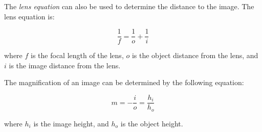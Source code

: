 The \textit{lens equation}  can also be used to determine the distance to the image.  The lens equation is:

	\begin{mdframed}[backgroundcolor=orange!20!white]
	
	\begin{equation}
	\frac{1}{f} = \frac{1}{o} + \frac{1}{i}
	\label{equation:lens}
	\end{equation}
\end{mdframed}
 where $f$ is the focal length of the lens, $o$ is the object distance from the lens, and $i$ is the image distance from the lens.  
 
 The magnification of an image can be determined by the following equation:
 	\begin{mdframed}[backgroundcolor=orange!20!white]
 	
 	\begin{equation}
 	m = - \frac{i}{o} = \frac{h_i}{h_o}
 	\label{equation:magnification}
 	\end{equation}
 \end{mdframed}
 
 where $h_i$ is the image height, and $h_o$ is the object height.  
 
 
 
